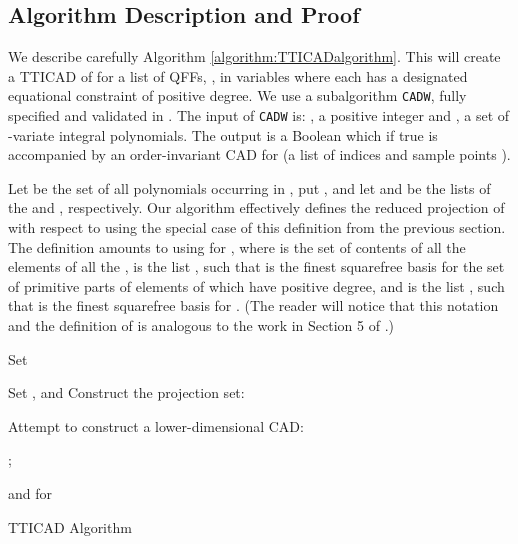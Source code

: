 \documentclass{article}
\begin{document}
\subsection{Algorithm Description and Proof} 
\label{subsec:alg}

We describe carefully Algorithm \ref{algorithm:TTICADalgorithm}.  This will create a TTICAD of  for a list of QFFs, , in variables  where each  has a designated equational constraint  of positive degree.  
We use a subalgorithm \texttt{CADW}, fully specified and validated in \cite{McCallum1998}.  The input of {\tt CADW} is: , a positive integer and , a set of -variate integral polynomials. The output is a Boolean  which if true is accompanied by an order-invariant CAD for  (a list of indices  and sample points ). 

Let  be the set of all polynomials occurring in ,
put , and let  and 
be the lists of the  and , respectively.
Our algorithm effectively defines the reduced projection of  
with respect to  using the special case
of this definition from the previous section. The definition amounts to using 
 for ,
where  is the set of contents of all the elements of all the ,
 is the list 
, such that  is the finest squarefree
basis for the set 
of primitive parts of elements of  which have 
positive degree, and  is the list
, such that  is the finest squarefree basis
for . (The reader will notice that this notation and the 
definition of  is analogous to the work in Section 5 of \cite{McCallum1999a}.)

\begin{algorithm}[h!]\label{algorithm:TTICADalgorithm}


\BlankLine
{} 
Set \;
{
Set ,
 and 
 \;
Construct the projection set:  \;


Attempt to construct a lower-dimensional CAD: \label{alg:step:cadw}\;
\label{TTICADn-1dimstep}

; \label{step:lifting1}\;

\Return  and  for \;
\caption{{TTICAD Algorithm}}
}
\end{algorithm}
\end{document}
